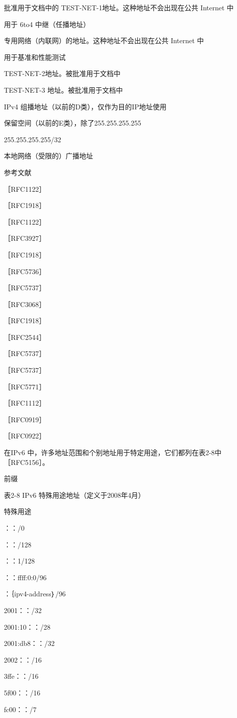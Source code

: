 批准用于文档中的 TEST-NET-1地址。这种地址不会出现在公共 Internet 中

用于 6to4 中继（任播地址）

专用网络（内联网）的地址。这种地址不会出现在公共 Internet 中

用于基准和性能测试

TEST-NET-2地址。被批准用于文档中

TEST-NET-3 地址。被批准用于文档中

IPv4 组播地址（以前的D类），仅作为目的IP地址使用

保留空间（以前的E类），除了255.255.255.255

255.255.255.255/32

本地网络（受限的）广播地址

参考文献

［RFC1122］

［RFC1918］

［RFC1122］

［RFC3927］

［RFC1918］

［RFC5736］

［RFC5737］

［RFC3068］

［RFC1918］

［RFC2544］

［RFC5737］

［RFC5737］

［RFC5771］

［RFC1112］

［RFC0919］

［RFC0922］

在IPv6 中，许多地址范围和个别地址用于特定用途，它们都列在表2-8中［RFC5156］。

前缀

表2-8 IPv6 特殊用途地址（定义于2008年4月）

特殊用途

：：/0

：：/128

：：1/128

：：ffff:0:0/96

：｛ipv4-address｝/96

2001：：/32

2001:10：：/28

2001:db8：：/32

2002：：/16

3ffe：：/16

5f00：：/16

fc00：：/7

